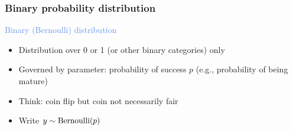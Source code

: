 \documentclass[dvipsnames]{beamer}
\begin{document}
\begin{frame}
 \frametitle{Binary probability distribution}
 \begin{center}
 \textcolor{CornflowerBlue}{Binary (Bernoulli) distribution}
 \end{center}

\begin{itemize}
  \item<only@2> Distribution over 0 or 1 (or other binary categories) only
  \item Governed by parameter: probability of success $p$ (e.g., probability of being mature)
  \item Think: coin flip but coin not necessarily fair
  \item Write $y \sim \textnormal{Bernoulli}(p)$
 \end{itemize}
\end{frame}
\end{document}
